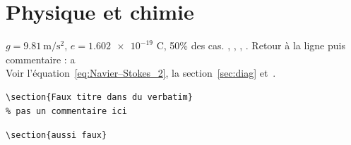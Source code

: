 \documentclass[11pt]{article}
\begin{document}
\section{Physique et chimie}
$g = \SI{9.81}{\metre\per\second\squared}$, $e = \num{1.602e-19}$ C, 50\% des cas.
, , , .
Retour à la ligne puis commentaire : a\\%
Voir l'équation~\eqref{eq:Navier–Stokes_2}, la section~\ref{sec:diag} et~\cite[th.~2]{knuth, lamport}.

\begin{verbatim}
\section{Faux titre dans du verbatim}
% pas un commentaire ici
\end{verbatim}
\verb|\section{aussi faux}|





\end{document}
